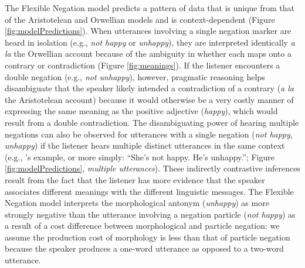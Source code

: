 \documentclass[floatsintext,doc]{apa6}
\let\rmarkdownfootnote\footnote%
\def\footnote{\protect\rmarkdownfootnote}
\newcommand{\ourmodel}{Flexible Negation\xspace}
\begin{document}
The \ourmodel model predicts a pattern of data that is unique from that of the Aristotelean and Orwellian models and is context-dependent (Figure \ref{fig:modelPredictions}).
When utterances involving a single negation marker are heard in isolation (e.g., \emph{not happy} or \emph{unhappy}), they are interpreted identically \emph{a la} the Orwellian account because of the ambiguity in whether each maps onto a contrary or contradiction (Figure \ref{fig:meanings}).  
If the listener encounters a double negation (e.g., \emph{not unhappy}), however, pragmatic reasoning helps disambiguate that the speaker likely intended a contradiction of a contrary (\emph{a la} the Aristotelean account) because it would otherwise be a very costly manner of expressing the same meaning as the positive adjective (\emph{happy}), which would result from a double contradiction.
The disambiguating power of hearing multiple negations can also be observed for utterances with a single negation (\emph{not happy}, \emph{unhappy}) if the listener hears multiple distinct utterances in the same context (e.g., 's example, or more simply: ``She's not happy. He's unhappy.''; Figure \ref{fig:modelPredictions}, \emph{multiple utterances}). These indirectly contrastive inferences result from the fact that the listener has more evidence that the speaker associates different meanings with the different linguistic messages.
The \ourmodel model interprets the morphological antonym (\emph{unhappy}) as more strongly negative than the utterance involving a negation particle (\emph{not happy})  as a result of a cost difference between morphological and particle negation: we assume the production cost of morphology is less than that of particle negation because the speaker produces a one-word utterance as opposed to a two-word utterance. 

%

\end{document}
